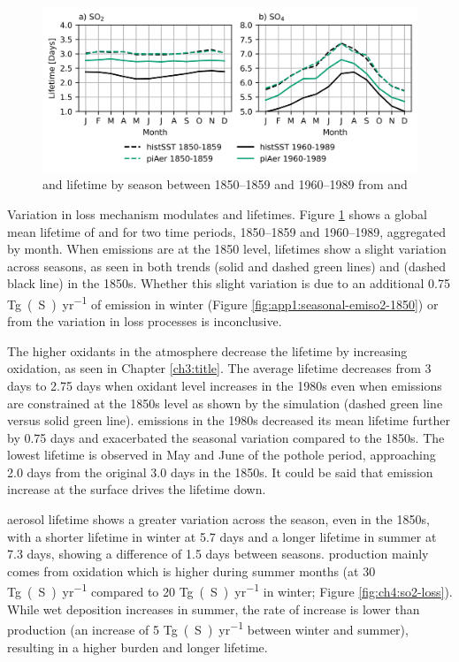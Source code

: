 \begin{figure}
    \centering
    \includegraphics{Chapter4/Figs/lifetime_pothole.png}
    \caption[ and  lifetime by season between 1980 and 1989]{ and  lifetime by season between 1850--1859 and 1960--1989 from \histsst{} and \sstpiaer{}}
    \label{fig:ch4:seasonal-s-lifetime}
\end{figure}


Variation in loss mechanism modulates  and  lifetimes. Figure \ref{fig:ch4:seasonal-s-lifetime} shows a global mean lifetime of  and  for two time periods, 1850--1859 and 1960--1989, aggregated by month. When  emissions are at the 1850 level,  lifetimes show a slight variation across seasons, as seen in both \sstpiaer{} trends (solid and dashed green lines) and \histsst{} (dashed black line) in the 1850s. Whether this slight variation is due to an additional 0.75 \unit{Tg(S)~yr^{-1}} of emission in winter (Figure \ref{fig:app1:seasonal-emiso2-1850}) or from the variation in loss processes is inconclusive. 

The higher oxidants in the atmosphere decrease the  lifetime by increasing oxidation, as seen in Chapter \ref{ch3:title}. The average  lifetime decreases from 3 days to 2.75 days when oxidant level increases in the 1980s even when  emissions are constrained at the 1850s level as shown by the \sstpiaer{} simulation (dashed green line versus solid green line).  emissions in the 1980s decreased its mean lifetime further by 0.75 days and exacerbated the seasonal variation compared to the 1850s. The lowest  lifetime is observed in May and June of the pothole period, approaching 2.0 days from the original 3.0 days in the 1850s. It could be said that  emission increase at the surface drives the lifetime down. 

 aerosol lifetime shows a greater variation across the season, even in the 1850s, with a shorter lifetime in winter at 5.7 days and a longer lifetime in summer at 7.3 days, showing a difference of 1.5 days between seasons.  production mainly comes from  oxidation which is higher during summer months (at 30 \unit{Tg(S)~yr^{-1}} compared to 20 \unit{Tg(S)~yr^{-1}} in winter; Figure \ref{fig:ch4:so2-loss}). While  wet deposition increases in summer, the rate of increase is lower than production (an increase of 5 \unit{Tg(S)~yr^{-1}} between winter and summer), resulting in a higher burden and longer lifetime. 


